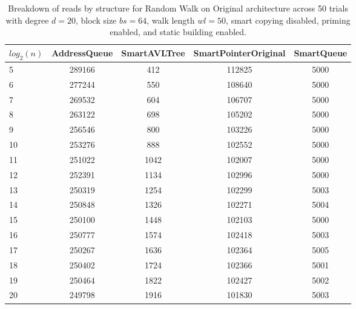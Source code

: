 \begin{table}[]
\centering
\begin{tabular}{|l|c|c|c|c|}
$log_2(n)$ & AddressQueue & SmartAVLTree & SmartPointerOriginal & SmartQueue \\ \hline
5 & 289166 & 412 & 112825 & 5000 \\ \hline
6 & 277244 & 550 & 108640 & 5000 \\ \hline
7 & 269532 & 604 & 106707 & 5000 \\ \hline
8 & 263122 & 698 & 105202 & 5000 \\ \hline
9 & 256546 & 800 & 103226 & 5000 \\ \hline
10 & 253276 & 888 & 102552 & 5000 \\ \hline
11 & 251022 & 1042 & 102007 & 5000 \\ \hline
12 & 252391 & 1134 & 102996 & 5000 \\ \hline
13 & 250319 & 1254 & 102299 & 5003 \\ \hline
14 & 250848 & 1326 & 102271 & 5004 \\ \hline
15 & 250100 & 1448 & 102103 & 5000 \\ \hline
16 & 250777 & 1574 & 102418 & 5003 \\ \hline
17 & 250267 & 1636 & 102364 & 5005 \\ \hline
18 & 250402 & 1724 & 102366 & 5001 \\ \hline
19 & 250464 & 1822 & 102427 & 5002 \\ \hline
20 & 249798 & 1916 & 101830 & 5003 \\ \hline
\end{tabular}
\caption{Breakdown of reads by structure for Random Walk on Original architecture across 50 trials with degree $d=20$, block size $bs=64$, walk length $wl=50$, smart copying disabled, priming enabled, and static building enabled.}
    \label{tab:reads_by_structure_rw_d20_bs64_trials50_copiesfalse_primetrue_staticinsertiontrue_wl50_ptoriginal_movefalse}
\end{table}

